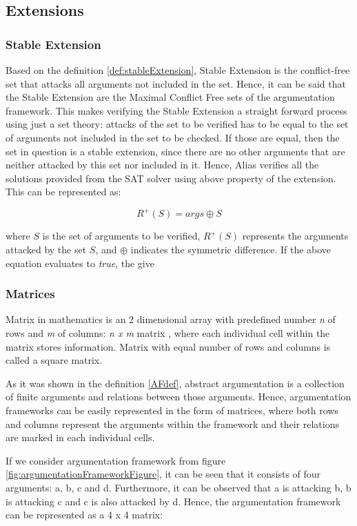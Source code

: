 \subsection{Extensions}
\subsubsection{Stable Extension} \label{section:stableExtension}
Based on the definition \ref{def:stableExtension}, Stable Extension is the conflict-free set that attacks all arguments not included in the set. Hence, it can be said that the Stable Extension are the Maximal Conflict Free sets of the argumentation framework. This makes verifying the Stable Extension a straight forward process using just a set theory: attacks of the set to be verified has to be equal to the set of arguments not included in the set to be checked. If those are equal, then the set in question is a stable extension, since there are no other arguments that are neither attacked by this set nor included in it. Hence, Alias verifies all the solutions provided from the SAT solver using above property of the extension. This can be represented as: 

\begin{equation}
R^+(S) = args \oplus S
\end{equation}

where $S$ is the set of arguments to be verified, $R^+(S)$ represents the arguments attacked by the set $S$, and $\oplus$ indicates the symmetric difference. If the above equation evaluates to \textit{true}, the give

\subsubsection{Matrices}
Matrix in mathematics is an 2 dimensional array with predefined number \textit{n} of rows and \textit{m} of columns: \textit{n x m} matrix \citep{matrices}, where each individual cell within the matrix stores information. Matrix with equal number of rows and columns is called a square matrix. 

As it was shown in the definition \ref{AFdef}, abstract argumentation is a collection of finite arguments and relations between those arguments. Hence, argumentation frameworks can be easily represented in the form of matrices, where both rows and columns represent the arguments within the framework and their relations are marked in each individual cells. 

If we consider argumentation framework from figure \ref{fig:argumentationFrameworkFigure}, it can be seen that it consists of four arguments: a, b, c and d. Furthermore, it can be observed that a is attacking b, b is attacking c and c is also attacked by d. Hence, the argumentation framework can be represented as a 4 x 4 matrix:

